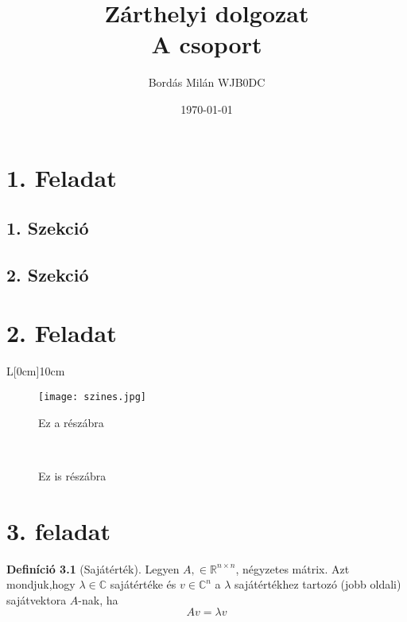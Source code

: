 \documentclass [11pt]{book}
\title{Zárthelyi dolgozat\\\Large A csoport}
\author{Bordás Milán WJB0DC}
\date{\today}
\theoremstyle{definition}
\newtheorem{defin}{Definíció}
\begin{document}
\pagestyle{fancy}
\maketitle

\chapter{1. Feladat}

\section{1. Szekció}
\hulipsum[1-5]
\section{2. Szekció}
\hulipsum[1-5]

\chapter{2. Feladat}
\hulipsum[1-2]
\begin{wrapfigure}[25]{L}[0cm]{10cm}
\centering
\caption{Ez itt az ábra}
\begin{subfigure}{5cm}
\centering
\caption{Ez a részábra}
\texttt{[image: szines.jpg]}
\end{subfigure}
\\
\begin{subfigure}{5cm}
\centering
\caption{Ez is részábra}
\end{subfigure}
\end{wrapfigure}
\hulipsum[1-2]
\chapter{3. feladat}
\begin{defin}[Sajátérték]

Legyen $A,\in \mathbb{R}^{n \times n}$, négyzetes mátrix. Azt mondjuk,hogy $\lambda \in \mathbb{C} $ sajátértéke és $v \in \mathbb{C}^n$
a $\lambda$ sajátértékhez tartozó (jobb oldali) sajátvektora $A$-nak, ha
\begin{equation} 
Av = \lambda v
\end{equation}
\end{defin}
\end{document}
